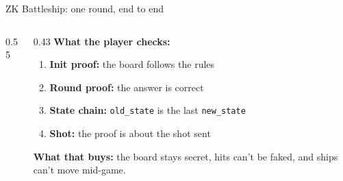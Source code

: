 \ifdefined\PRESENTATION\else\PassOptionsToClass{handout}{beamer}\fi\documentclass[aspectratio=169, lualatex]{beamer}
\begin{document}
\begin{frame}{ZK Battleship: one round, end to end}
	\begin{columns}[c]
		\begin{column}{0.55\textwidth}
			\vspace{-1.6cm}
			\begin{center}
			\end{center}
		\end{column}
		\begin{column}{0.43\textwidth}
			\textbf{What the player checks:}
			\begin{enumerate}
				\item \textbf{Init proof:} the board follows the rules
				\item \textbf{Round proof:} the answer is correct
				\item \textbf{State chain:} \texttt{old\_state} is the last \texttt{new\_state}
				\item \textbf{Shot:} the proof is about the shot sent
			\end{enumerate}
			\textbf{What that buys:} the board stays secret, hits can't be faked, and ships can't move mid-game.
		\end{column}
	\end{columns}
\end{frame}
\end{document}
